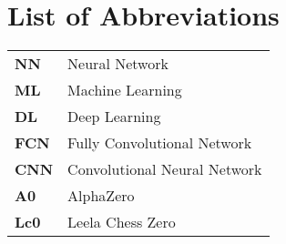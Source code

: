 \chapter*{\centering List of Abbreviations}

\begin{spacing}{1.5}
\setlength{\parskip}{0.3in}

\begin{table}[ht]
\centering
\begin{tabular}{ll}
\textbf{NN} & Neural Network \\
\textbf{ML} & Machine Learning \\
\textbf{DL} & Deep Learning \\
\textbf{FCN} & Fully Convolutional Network \\
\textbf{CNN} & Convolutional Neural Network \\
\textbf{A0} & AlphaZero \\
\textbf{Lc0} & Leela Chess Zero
\end{tabular}%
\end{table}

\end{spacing}
\newpage
